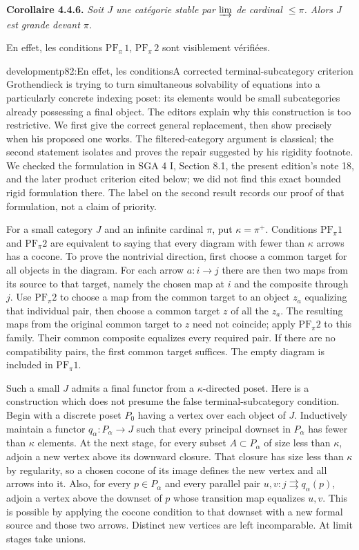 \textbf{Corollaire 4.4.6.} \textit{Soit $J$ une catégorie stable par} $\varinjlim$ \textit{de cardinal $\leqslant \pi$. Alors $J$ est grande devant $\pi$.}

En effet, les conditions $\mathrm{PF}_{\pi}\,1$, $\mathrm{PF}_{\pi}\,2$ sont visiblement vérifiées.

\begin{dcomment}{development}{p82:En effet, les conditions}{A corrected terminal-subcategory criterion}
Grothendieck is trying to turn simultaneous solvability of equations into a particularly concrete indexing poset: its elements would be small subcategories already possessing a final object.  The editors explain why this construction is too restrictive.  We first give the correct general replacement, then show precisely when his proposed one works.  The filtered-category argument is classical; the second statement isolates and proves the repair suggested by his rigidity footnote.  We checked the formulation in SGA 4 I, Section 8.1, the present edition's note 18, and the later product criterion cited below; we did not find this exact bounded rigid formulation there.  The label on the second result records our proof of that formulation, not a claim of priority.

For a small category $J$ and an infinite cardinal $\pi$, put $\kappa=\pi^+$.  Conditions $\mathrm{PF}_\pi1$ and $\mathrm{PF}_\pi2$ are equivalent to saying that every diagram with fewer than $\kappa$ arrows has a cocone.  To prove the nontrivial direction, first choose a common target for all objects in the diagram.  For each arrow $a:i\to j$ there are then two maps from its source to that target, namely the chosen map at $i$ and the composite through $j$.  Use $\mathrm{PF}_\pi2$ to choose a map from the common target to an object $z_a$ equalizing that individual pair, then choose a common target $z$ of all the $z_a$.  The resulting maps from the original common target to $z$ need not coincide; apply $\mathrm{PF}_\pi2$ to this family.  Their common composite equalizes every required pair.  If there are no compatibility pairs, the first common target suffices.  The empty diagram is included in $\mathrm{PF}_\pi1$.

Such a small $J$ admits a final functor from a $\kappa$-directed poset.  Here is a construction which does not presume the false terminal-subcategory condition.  Begin with a discrete poset $P_0$ having a vertex over each object of $J$.  Inductively maintain a functor $q_\alpha:P_\alpha\to J$ such that every principal downset in $P_\alpha$ has fewer than $\kappa$ elements.  At the next stage, for every subset $A\subset P_\alpha$ of size less than $\kappa$, adjoin a new vertex above its downward closure.  That closure has size less than $\kappa$ by regularity, so a chosen cocone of its image defines the new vertex and all arrows into it.  Also, for every $p\in P_\alpha$ and every parallel pair $u,v:j\rightrightarrows q_\alpha(p)$, adjoin a vertex above the downset of $p$ whose transition map equalizes $u,v$.  This is possible by applying the cocone condition to that downset with a new formal source and those two arrows.  Distinct new vertices are left incomparable.  At limit stages take unions.


\end{dcomment}
